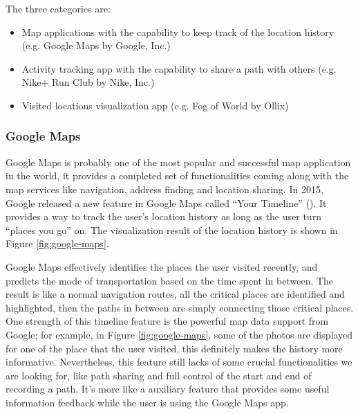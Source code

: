 \documentclass[12pt,a4paper]{article}
\renewcommand\texttt[1]{{\ttfamily\color{textttColor}#1}}
\begin{document}
        The three categories are:
        \begin{itemize}
            \setlength\itemsep{-0.5em}
            \item Map applications with the capability to keep track of the location history (e.g. Google Maps by Google, Inc.)
            \item Activity tracking app with the capability to share a path with others (e.g. Nike\texttt{+} Run Club by Nike, Inc.)
            \item Visited locations visualization app (e.g. Fog of World by Ollix)
        \end{itemize}
        
            \subsubsection{Google Maps}
            \label{intro:comparison:google-maps}
            Google Maps is probably one of the most popular and successful map application in the world, it provides a completed set of functionalities coming along with the map services like navigation, address finding and location sharing. In 2015, Google released a new feature in Google Maps called ``Your Timeline'' (\citet{GoogleMapsTimelineBlog}). It provides a way to track the user's location history as long as the user turn ``places you go'' on. The visualization result of the location history is shown in Figure \ref{fig:google-maps}.
            
            Google Maps effectively identifies the places the user visited recently, and predicts the mode of transportation based on the time spent in between. The result is like a normal navigation routes, all the critical places are identified and highlighted, then the paths in between are simply connecting those critical places. One strength of this timeline feature is the powerful map data support from Google; for example, in Figure \ref{fig:google-maps}, some of the photos are displayed for one of the place that the user visited, this definitely makes the history more informative. Nevertheless, this feature still lacks of some crucial functionalities we are looking for, like path sharing and full control of the start and end of recording a path. It's more like a auxiliary feature that provides some useful information feedback while the user is using the Google Maps app.
            
\end{document}

